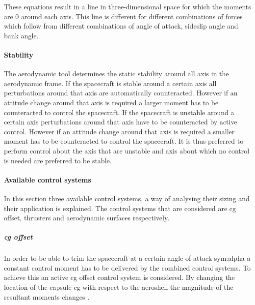 These equations result in a line in three-dimensional space for which the moments are 0 around each axis. This line is different for different combinations of forces which follow from different combinations of angle of attack, sideslip angle and bank angle.

\paragraph{Stability}
\label{control:stab}
The aerodynamic tool determines the static stability around all axis in the aerodynamic frame. If the spacecraft is stable around a certain axis all perturbations around that axis are automatically counteracted. However if an attitude change around that axis is required a larger moment has to be counteracted to control the spacecraft.  If the spacecraft is unstable around a certain axis perturbations around that axis have to be counteracted by active control. However if an attitude change around that axis is required a smaller moment has to be counteracted to control the spacecraft. It is thus preferred to perform control about the axis that are unstable and axis about which no control is needed are preferred to be stable.

\paragraph{Available control systems}
\label{control:system}
In this section three available control systems, a way of analysing their sizing and their application is explained. The control systems that are considered are \gls{cg} offset, thrusters and aerodynamic surfaces respectively.

\subparagraph{\acrlong{cg} offset}
In order to be able to trim the spacecraft at a certain angle of attack \gls{sym:alpha} a constant control moment has to be delivered by the combined control systems. To achieve this an active \gls{cg} offset control system is considered. By changing the location of the capsule \gls{cg} with respect to the aeroshell the magnitude of the resultant moments changes \cite{Mulqueen1991}. 



